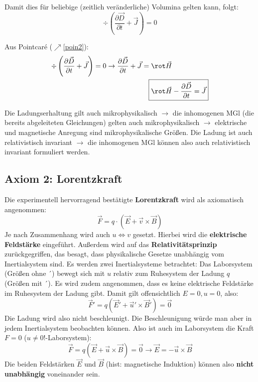 	   Damit dies für beliebige (zeitlich veränderliche) Volumina gelten kann,
	        folgt:
	        \begin{equation}
		        \div \left( \frac{\partial \vec{D}}{\partial t}+ \vec{J}\right) = 0
	        \end{equation}

	   Aus Pointcaré ($\nearrow$\ref{poin2}):
	        \begin{equation}
		        \begin{split}
			        \div \left( \frac{\partial \vec{D}}{\partial t}+ \vec{J}\right) = 0 \to
			        \frac{\partial \vec{D}}{\partial t}+ \vec{J}= \rot\vec{H}&\\ \Aboxed{\rot\vec{H}
			        &- \frac{\partial \vec{D}}{\partial t}= \vec{J}}
		        \end{split}
	        \end{equation}

	  Die Ladungserhaltung gilt auch mikrophysikalisch $\to$ die inhomogenen
		  MGl (die bereits abgeleiteten Gleichungen) gelten auch mikrophysikalisch $\to$ elektrische und magnetische
		  Anregung sind mikrophysikalische Größen.  Die Ladung ist auch relativistisch invariant $\to$ die inhomogenen MGl
		  können also auch relativistisch invariant formuliert werden. 
 \subsection{Axiom 2: Lorentzkraft}
 Die experimentell hervorragend bestätigte \textbf{Lorentzkraft} wird als axiomatisch angenommen:
	       	  \begin{equation}\label{lorentz}
	       	\boxed{\vec{F} =  q \cdot \left( \vec{E} + {\vec{v} \times \vec{B} } \right)}
	       \end{equation}
	        Je nach Zusammenhang wird auch $u\Leftrightarrow v$ gesetzt. Hierbei wird die \textbf{elektrische Feldstärke} eingeführt. Außerdem wird auf das  \textbf{Relativitätsprinzip} zurückgegriffen, das besagt, dass physikalische Gesetze unabhängig vom
	        Inertialsystem sind. Es werden zwei Inertialsysteme betrachtet: Das Laborsystem (Größen ohne ´) bewegt sich mit $u$ relativ zum Ruhesystem der Ladung $q$ (Größen mit ´). Es wird zudem angenommen, dass es keine elektrische Feldstärke im Ruhesystem der Ladung gibt. Damit gilt offensichtlich $E=0,u=0$, also:
		              \begin{equation}
			              \vec{F}' = q \left( \vec{E}' + \vec{u}' \times \vec{B}' \right) = \vec
			              {0}
		              \end{equation}
		   Die Ladung wird also nicht beschleunigt. Die Beschleunigung würde man aber in jedem Inertialsystem beobachten können. Also ist auch im Laborsystem die Kraft $F=0$ ($u\neq0$!-Laborsystem):
		              \begin{equation}
			              \vec{F}= q \left( \vec{E}+ \vec{u}\times \vec{B}\right) = \vec{0}\to
			              \vec{E}= - \vec{u}\times \vec{B}
		              \end{equation}
		         Die beiden Feldstärken $\vec{E}$ und $\vec{B}$ (hist: magnetische Induktion)
		              können also \textbf{nicht unabhängig} voneinander sein.


